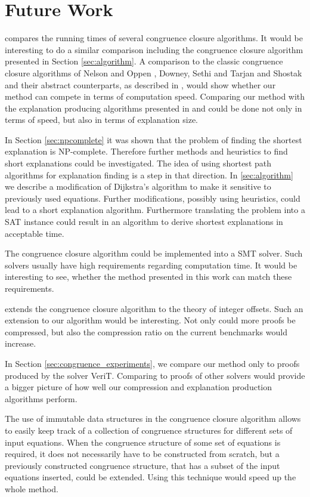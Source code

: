 \section{Future Work}

\cite{Bachmair2000} compares the running times of several congruence closure algorithms.
It would be interesting to do a similar comparison including the congruence closure algorithm presented in Section \ref{sec:algorithm}.
A comparison to the classic congruence closure algorithms of Nelson and Oppen \cite{Nelson1980}, Downey, Sethi and Tarjan \cite{Downey1980} and Shostak \cite{Shostak1978} and their abstract counterparts, as described in \cite{Bachmair2000}, would show whether our method can compete in terms of computation speed.
Comparing our method with the explanation producing algorithms presented in \cite{Fontaine2004} and \cite{Nieuwenhuis2005,Nieuwenhuis2007} could be done not only in terms of speed, but also in terms of explanation size.

In Section \ref{sec:npcomplete} it was shown that the problem of finding the shortest explanation is NP-complete.
Therefore further methods and heuristics to find short explanations could be investigated.
The idea of using shortest path algorithms for explanation finding is a step in that direction.
In \ref{sec:algorithm} we describe a modification of Dijkstra's algorithm \cite{Dijkstra1959} to make it sensitive to previously used equations.
Further modifications, possibly using heuristics, could lead to a short explanation algorithm.
Furthermore translating the problem into a SAT instance could result in an algorithm to derive shortest explanations in acceptable time.

The congruence closure algorithm could be implemented into a SMT solver.
Such solvers usually have high requirements regarding computation time.
It would be interesting to see, whether the method presented in this work can match these requirements.

\cite{Nieuwenhuis2007} extends the congruence closure algorithm to the theory of integer offsets.
Such an extension to our algorithm would be interesting.
Not only could more proofs be compressed, but also the compression ratio on the current benchmarks would increase.

In Section \ref{sec:congruence_experiments}, we compare our method only to proofs produced by the solver VeriT.
Comparing to proofs of other solvers would provide a bigger picture of how well our compression and explanation production algorithms perform.

The use of immutable data structures in the congruence closure algorithm allows to easily keep track of a collection of congruence structures for different sets of input equations.
When the congruence structure of some set of equations is required, it does not necessarily have to be constructed from scratch, but a previously constructed congruence structure, that has a subset of the input equations inserted, could be extended.
Using this technique would speed up the whole method.